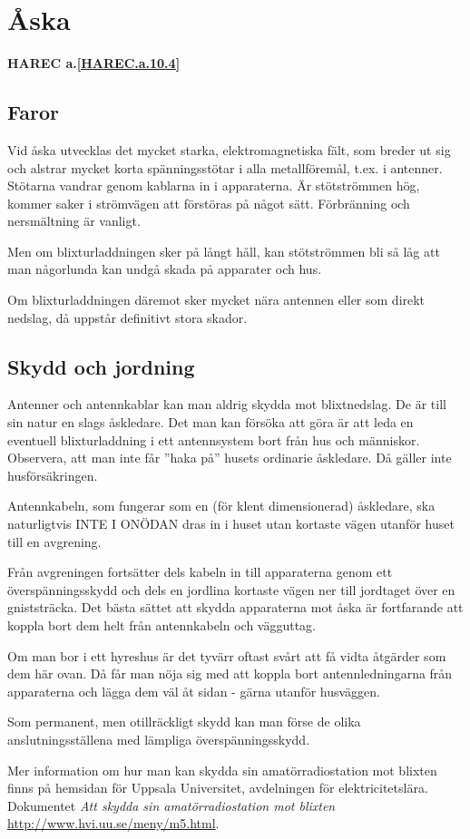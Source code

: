 \section{Åska}
\textbf{
HAREC a.\ref{HAREC.a.10.4}\label{myHAREC.a.10.4}
}

\subsection{Faror}

Vid åska utvecklas det mycket starka, elektromagnetiska fält, som
breder ut sig och alstrar mycket korta spänningsstötar i alla
metallföremål, t.ex. i antenner. Stötarna vandrar genom kablarna in i
apparaterna. Är stötströmmen hög, kommer saker i strömvägen att förstöras
på något sätt.  Förbränning och nersmältning är vanligt.

Men om blixturladdningen sker på långt håll, kan stötströmmen bli så låg att
man någorlunda kan undgå skada på apparater och hus.

Om blixturladdningen däremot sker mycket nära antennen eller som direkt nedslag,
då uppstår definitivt stora skador.

\subsection{Skydd och jordning}

Antenner och antennkablar kan man aldrig skydda mot blixtnedslag. De är 
till sin natur en slags åskledare. Det man kan försöka att göra är
att leda en eventuell blixturladdning i ett antennsystem bort från hus
och människor. Observera, att man inte får ''haka på'' husets
ordinarie åskledare. Då gäller inte husförsäkringen.

Antennkabeln, som fungerar som en (för klent dimensionerad) åskledare,
ska naturligtvis INTE I ONÖDAN dras in i huset utan kortaste vägen
utanför huset till en avgrening.

Från avgreningen fortsätter dels kabeln in till apparaterna genom ett
överspänningsskydd och dels en jordlina kortaste vägen ner till
jordtaget över en gniststräcka. Det bästa sättet att skydda
apparaterna mot åska är fortfarande att koppla bort dem helt från
antennkabeln och vägguttag.

Om man bor i ett hyreshus är det tyvärr oftast svårt att få vidta
åtgärder som dem här ovan. Då får man nöja sig med att koppla
bort antennledningarna från apparaterna och lägga dem väl åt sidan -
gärna utanför husväggen.

Som permanent, men otillräckligt skydd kan man förse de olika
anslutningsställena med lämpliga överspänningsskydd.

Mer information om hur man kan skydda sin amatörradiostation mot blixten
finns på hemsidan för Uppsala Universitet, avdelningen för elektricitetslära.
Dokumentet \emph{Att skydda sin amatörradiostation mot blixten}
\url{http://www.hvi.uu.se/meny/m5.html}.
